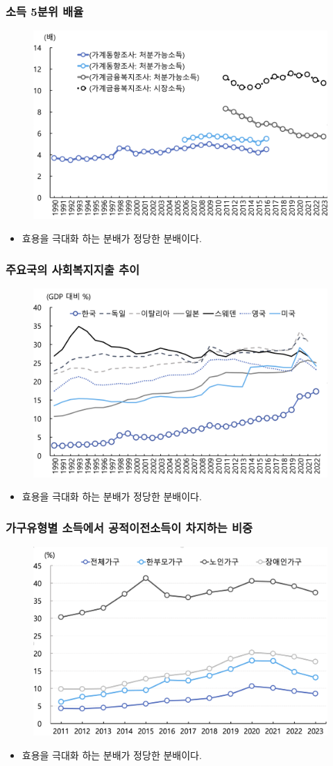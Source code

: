 \documentclass[aspectratio=169,xcolor=dvipsnames,handout]{beamer}
\begin{document}
\begin{frame}[<+->]
\frametitle{소득 5분위 배율}
    \begin{figure}
        \centering
        \includegraphics[width=.55\textwidth]{pic/fig_ineq_09.png}
    \end{figure}
    \begin{itemize}
        \item 효용을 극대화 하는 분배가 정당한 분배이다.
    \end{itemize}
\end{frame}

\begin{frame}[<+->]
\frametitle{주요국의 사회복지지출 추이}
    \begin{figure}
        \centering
        \includegraphics[width=.55\textwidth]{pic/fig_ineq_10.png}
    \end{figure}
    \begin{itemize}
        \item 효용을 극대화 하는 분배가 정당한 분배이다.
    \end{itemize}
\end{frame}

\begin{frame}[<+->]
\frametitle{가구유형별 소득에서 공적이전소득이 차지하는 비중}
    \begin{figure}
        \centering
        \includegraphics[width=.55\textwidth]{pic/fig_ineq_11.png}
    \end{figure}
    \begin{itemize}
        \item 효용을 극대화 하는 분배가 정당한 분배이다.
    \end{itemize}
\end{frame}
\end{document}
